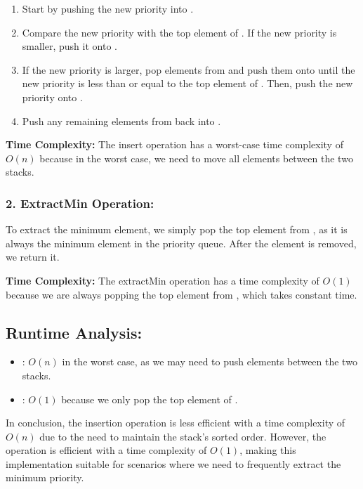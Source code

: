 \documentclass{article}
\begin{document}
\begin{enumerate}
    \item Start by pushing the new priority into .
    \item Compare the new priority with the top element of . If the new priority is smaller, push it onto .
    \item If the new priority is larger, pop elements from  and push them onto  until the new priority is less than or equal to the top element of . Then, push the new priority onto .
    \item Push any remaining elements from  back into .
\end{enumerate}

\textbf{Time Complexity:} 
The insert operation has a worst-case time complexity of $O(n)$ because in the worst case, we need to move all elements between the two stacks.

\subsubsection*{2. ExtractMin Operation:}

To extract the minimum element, we simply pop the top element from , as it is always the minimum element in the priority queue. After the element is removed, we return it.

\textbf{Time Complexity:} 
The extractMin operation has a time complexity of $O(1)$ because we are always popping the top element from , which takes constant time.

\subsection*{Runtime Analysis:}

\begin{itemize}
    \item {}: $O(n)$ in the worst case, as we may need to push elements between the two stacks.
    \item {} : $O(1)$ because we only pop the top element of .
\end{itemize}

In conclusion, the insertion operation is less efficient with a time complexity of $O(n)$ due to the need to maintain the stack's sorted order. However, the  operation is efficient with a time complexity of $O(1)$, making this implementation suitable for scenarios where we need to frequently extract the minimum priority.
\end{document}
